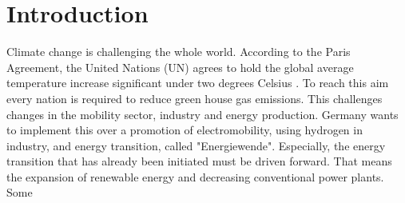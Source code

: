 \chapter{Introduction}
\label{ch:introduction}
Climate change is challenging the whole world. According to the Paris Agreement, the United Nations (UN) agrees to hold the global average temperature increase significant under two degrees Celsius \cite{UnitedNations.2015}. To reach this aim every nation is required to reduce green house gas emissions. This challenges  changes in the mobility sector, industry and energy production. Germany wants to implement this over a promotion of electromobility, using hydrogen in industry, and energy transition, called "Energiewende". Especially, the energy transition that has already been initiated must be driven forward. That means the expansion of renewable energy and decreasing conventional power plants. Some  

%

